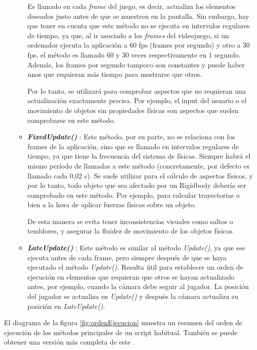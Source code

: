 \begin{itemize}
\begin{itemize}
    Es llamado en cada \textit{frame} del juego, es decir, actualiza los elementos deseados justo antes de que se muestren en la pantalla. Sin embargo, hay que tener en cuenta que este método no se ejecuta en intervalos regulares de tiempo, ya que, al ir asociado a los \textit{frames} del videojuego, si un ordenador ejecuta la aplicación a 60 fps (frames por segundo) y otro a 30 fps, el método es llamado 60 y 30 veces respectivamente en 1 segundo. Además, los frames por segundo tampoco son constantes y puede haber unos que requieran más tiempo para mostrarse que otros.
    
    Por lo tanto, se utilizará para comprobar aspectos que no requieran una actualización exactamente precisa. Por ejemplo, el input del usuario o el movimiento de objetos sin propiedades físicas son aspectos que suelen comprobarse en este método.
    \item \textbf{\textit{FixedUpdate()}} \cite{doc:FixedUpdate}: Este método, por su parte, no se relaciona con los frames de la aplicación, sino que es llamado en intervalos regulares de tiempo, ya que tiene la frecuencia del sistema de físicas. Siempre habrá el mismo período de llamadas a este método (concretamente, por defecto es llamado cada 0,02 s). Se suele utilizar para el cálculo de aspectos físicos, y por lo tanto, todo objeto que sea afectado por un Rigidbody debería ser comprobado en este método. Por ejemplo, para calcular trayectorias o bien a la hora de aplicar fuerzas físicas sobre un objeto.
    
    De esta manera se evita tener inconsistencias visuales como saltos o temblores, y asegurar la fluidez de movimiento de los objetos físicos.
    \item \textbf{\textit{LateUpdate()}} \cite{doc:LateUpdate}: Este método es similar al método \textit{Update()}, ya que ese ejecuta antes de cada frame, pero siempre después de que se haya ejecutado el método \textit{Update()}. Resulta útil para establecer un orden de ejecución en elementos que requieran que otros se hayan actualizado antes, por ejemplo, cuando la cámara debe seguir al jugador. La posición del jugador se actualiza en \textit{Update()} y después la cámara actualiza su posición en \textit{LateUpdate()}.
    \end{itemize}
\end{itemize}
El diagrama de la figura \ref{fig:ordenEjecucion} muestra un resumen del orden de ejecución de los métodos principales de un script habitual. También se puede obtener una versión más completa de este \cite{doc:ExecutionOrder}.
